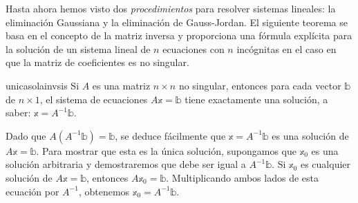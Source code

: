 Hasta ahora hemos visto dos \textit{procedimientos} para resolver sistemas lineales: la eliminación Gaussiana y la eliminación de Gauss-Jordan. El siguiente teorema se basa en el concepto de la matriz inversa y proporciona una fórmula explícita para la solución de un sistema lineal de $n$ ecuaciones con $n$ incógnitas en el caso en que la matriz de coeficientes es no singular.

\begin{theorem}{}{unicasolainvsis}
    Si $A$ es una matriz $n \times n$ no singular, entonces para cada vector $\mathbb{b}$ de $n \times 1$, el sistema de ecuaciones $A\mathbb{x} = \mathbb{b}$ tiene exactamente una solución, a saber: $\mathbb{x} = A^{-1}\mathbb{b}$.

    \tcblower
    \demostracion Dado que $A\left(A^{-1}\mathbb{b}\right) = \mathbb{b}$, se deduce fácilmente que $\mathbb{x} = A^{-1}\mathbb{b}$ es una solución de $A\mathbb{x} = \mathbb{b}$. Para mostrar que esta es la única solución, supongamos que $\mathbb{x}_0$ es una solución arbitraria y demostraremos que debe ser igual a $A^{-1}\mathbb{b}$. Si $\mathbb{x}_0$ es cualquier solución de $A\mathbb{x} = \mathbb{b}$, entonces $A\mathbb{x}_0 = \mathbb{b}$. Multiplicando ambos lados de esta ecuación por $A^{-1}$, obtenemos $\mathbb{x}_0 = A^{-1}\mathbb{b}$.
\end{theorem}

\newpage

